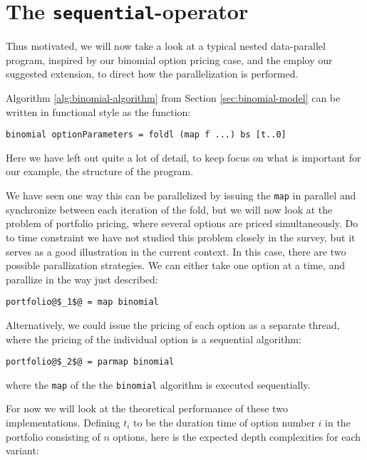 \section{The \texttt{sequential}-operator}

Thus motivated, we will now take a look at a typical nested
data-parallel program, inspired by our binomial option pricing case,
and the employ our suggested extension, to direct how the
parallelization is performed.

Algorithm \ref{alg:binomial-algorithm} from Section
\ref{sec:binomial-model} can be written in functional style as the
function:
\begin{lstlisting}
binomial optionParameters = foldl (map f ...) bs [t..0]
\end{lstlisting}
Here we have left out quite a lot of detail, to keep focus on what is
important for our example, the structure of the program.

We have seen one way this can be parallelized by issuing the
\lstinline{map} in parallel and synchronize between each
iteration of the fold, but we will now look at the problem of
portfolio pricing, where several options are priced simultaneously. Do
to time constraint we have not studied this problem closely in the
survey, but it serves as a good illustration in the current
context. In this case, there are two possible parallization
strategies. We can either take one option at a time, and parallize in
the way just described:
\begin{lstlisting}
portfolio@$_1$@ = map binomial
\end{lstlisting}
Alternatively, we could issue the pricing of each option as a separate
thread, where the pricing of the individual option is a sequential algorithm:
\begin{lstlisting}
portfolio@$_2$@ = parmap binomial
\end{lstlisting}
where the \lstinline{map} of the the \lstinline{binomial} algorithm is
executed sequentially.

For now we will look at the theoretical performance of these two
implementations.  Defining $t_i$ to be the duration time of option number $i$
in the portfolio consisting of $n$ options, here is the expected depth
complexities for each variant:

